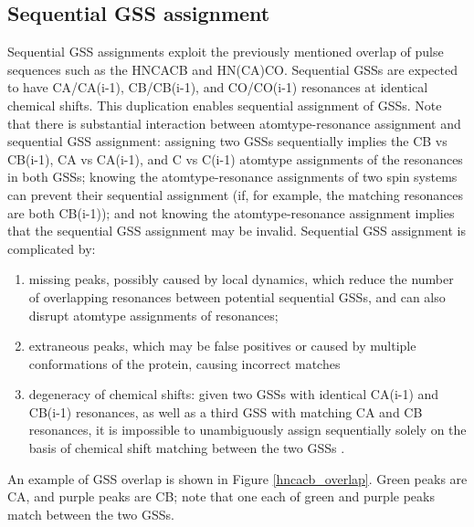 \subsection*{Sequential GSS assignment}
Sequential GSS assignments exploit the previously mentioned overlap of pulse
sequences such as the HNCACB and HN(CA)CO.  Sequential GSSs 
are expected to have CA/CA(i-1), CB/CB(i-1), and CO/CO(i-1) resonances at 
identical chemical shifts.  This duplication enables sequential assignment 
of GSSs.  Note that there is substantial interaction between atomtype-resonance 
assignment and sequential GSS assignment: assigning two GSSs sequentially 
implies the CB vs CB(i-1), CA vs CA(i-1), and C vs C(i-1) atomtype assignments 
of the resonances in both GSSs; knowing the atomtype-resonance assignments of 
two spin systems can prevent their sequential assignment (if, for example, the 
matching resonances are both CB(i-1)); and not knowing the atomtype-resonance 
assignment implies that the sequential GSS assignment may be invalid.  
Sequential GSS assignment is complicated by: 
\begin{enumerate}
  \item missing peaks, possibly caused 
  by local dynamics, which reduce the number of overlapping resonances between 
  potential sequential GSSs, and can also disrupt atomtype assignments of 
  resonances; 
  \item extraneous peaks, which may be false positives or caused by 
  multiple conformations of the protein, causing incorrect matches
  \item degeneracy of chemical shifts:  given two GSSs with identical CA(i-1) 
  and CB(i-1) resonances, as well as a third GSS with matching CA and CB 
  resonances, it is impossible to unambiguously assign sequentially solely 
  on the basis of chemical shift matching between the two GSSs 
  \cite{autoassign1997}.
\end{enumerate}

An example of GSS overlap is shown in Figure \ref{hncacb_overlap}.  Green peaks
are CA, and purple peaks are CB; note that one each of green and purple peaks
match between the two GSSs.

